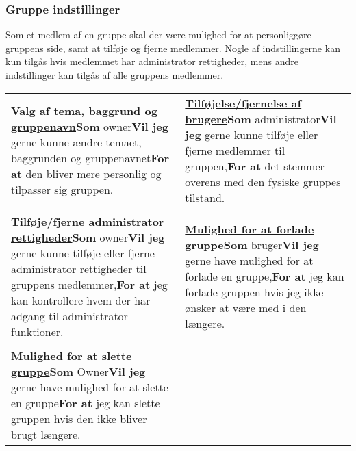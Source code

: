 \subsubsection{Gruppe indstillinger}

\noindent Som et medlem af en gruppe skal der være mulighed for at personliggøre gruppens side, samt at tilføje og fjerne medlemmer. Nogle af indstillingerne kan kun tilgås hvis medlemmet har administrator rettigheder, mens andre indstillinger kan tilgås af alle gruppens medlemmer.\newline

\begin{tabular}{p{2.5in}p{2.5in}}
\textbf{\underline{Valg af tema, baggrund og gruppenavn}}\newline \textbf{Som} owner\newline \textbf{Vil jeg} gerne kunne ændre temaet, baggrunden og gruppenavnet\newline \textbf{For at} den bliver mere personlig og tilpasser sig gruppen. & 

\textbf{\underline{Tilføjelse/fjernelse af brugere}}\newline \textbf{Som} administrator\newline \textbf{Vil jeg} gerne kunne tilføje eller fjerne medlemmer til gruppen,\newline \textbf{For at} det stemmer overens med den fysiske gruppes tilstand.  \\\\

\textbf{\underline{Tilføje/fjerne administrator rettigheder}}\newline \textbf{Som} owner\newline \textbf{Vil jeg} gerne kunne tilføje eller fjerne administrator rettigheder til gruppens medlemmer,\newline \textbf{For at} jeg kan kontrollere hvem der har adgang til administrator-funktioner.  & 

\textbf{\underline{Mulighed for at forlade gruppe}}\newline \textbf{Som} bruger\newline \textbf{Vil jeg} gerne have mulighed for at forlade en gruppe,\newline \textbf{For at} jeg kan forlade gruppen hvis jeg ikke ønsker at være med i den længere.  \\\\  

\textbf{\underline{Mulighed for at slette gruppe}}\newline \textbf{Som} Owner\newline \textbf{Vil jeg} gerne have mulighed for at slette en gruppe\newline \textbf{For at} jeg kan slette gruppen hvis den ikke bliver brugt længere.  &


\end{tabular}
